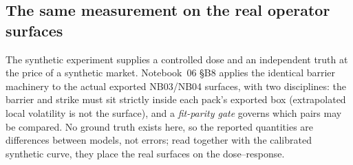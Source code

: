 
\subsection{The same measurement on the real operator surfaces}\label{sec:barrierreal}

The synthetic experiment supplies a controlled dose and an independent truth at the price of a
synthetic market. Notebook~06 \S B8 applies the identical barrier machinery to the actual
exported NB03/NB04 surfaces, with two disciplines: the barrier and strike must sit strictly
inside each pack's exported box (extrapolated local volatility is not the surface), and a
\emph{fit-parity gate} governs which pairs may be compared. No ground truth exists here, so
the reported quantities are differences between models, not errors; read together with the
calibrated synthetic curve, they place the real surfaces on the dose--response.

